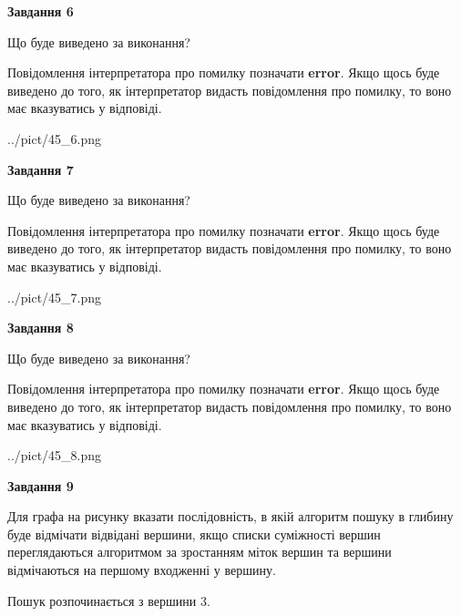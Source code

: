 \documentclass[12pt, ukrainian]{article}
\begin{document}
{\begin {large}
{\begin {center}\textbf{Завдання 6}\end {center}}\par
Що буде виведено за виконання?

Повідомлення інтерпретатора про помилку позначати \textbf{error}.
Якщо щось буде виведено до того, як інтерпретатор видасть повідомлення про помилку, 
то воно має вказуватись у відповіді. \par


\begin{center}
	{../pict/45_6.png}
\end{center}
\newpage

{\begin {center}\textbf{Завдання 7}\end {center}}\par
Що буде виведено за виконання?

Повідомлення інтерпретатора про помилку позначати \textbf{error}.
Якщо щось буде виведено до того, як інтерпретатор видасть повідомлення про помилку, 
то воно має вказуватись у відповіді. \par


\begin{center}
	{../pict/45_7.png}
\end{center}
\newpage

{\begin {center}\textbf{Завдання 8}\end {center}}\par
Що буде виведено за виконання?

Повідомлення інтерпретатора про помилку позначати \textbf{error}.
Якщо щось буде виведено до того, як інтерпретатор видасть повідомлення про помилку, 
то воно має вказуватись у відповіді. \par


\begin{center}
	{../pict/45_8.png}
\end{center}
\newpage

{\begin {center}\textbf{Завдання 9}\end {center}}\par
Для графа на рисунку вказати послідовність, в якій алгоритм пошуку в глибину буде відмічати відвідані вершини, якщо списки суміжності вершин переглядаються алгоритмом за зростанням міток вершин та вершини відмічаються на першому вход\-женні у вершину.\par
Пошук розпочинається з вершини 3.\par


\end{large}}
\end{document}
